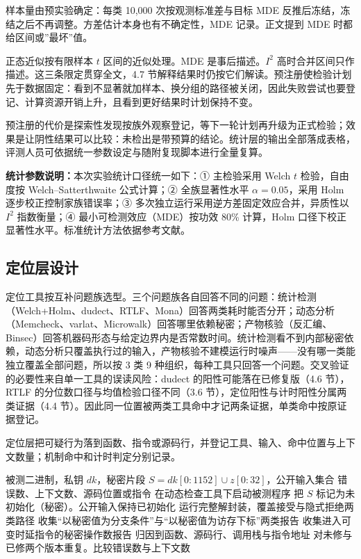 样本量由预实验确定：每类 10,000 次按观测标准差与目标 MDE 反推后冻结，冻结之后不再调整。方差估计本身也有不确定性，MDE 记录。正文提到 MDE 时都给区间或”最坏”值。

正态近似按有限样本 $t$ 区间的近似处理。MDE 是事后描述。$I^2$ 高时合并区间只作描述。这三条限定贯穿全文，4.7 节解释结果时仍按它们解读。预注册使检验计划先于数据固定：看到不显著就加样本、换分组的路径被关闭，因此失败尝试也要登记、计算资源开销上升，且看到更好结果时计划保持不变。

预注册的代价是探索性发现按族外观察登记，等下一轮计划再升级为正式检验；效果是让阴性结果可以比较：未检出是带预算的结论。统计层的输出全部落成表格，评测人员可依据统一参数设定与随附复现脚本进行全量复算。

\textbf{统计参数说明：}本次实验统计口径统一如下：① 主检验采用 Welch $t$ 检验，自由度按 Welch--Satterthwaite 公式计算；② 全族显著性水平 $\alpha=0.05$，采用 Holm 逐步校正控制家族错误率；③ 多次独立运行采用逆方差固定效应合并，异质性以 $I^2$ 指数衡量；④ 最小可检测效应（MDE）按功效 80\% 计算，Holm 口径下校正显著性水平。标准统计方法依据参考文献\cite{dudect,rtlf}。

\subsection{定位层设计}

定位工具按互补问题族选型。三个问题族各自回答不同的问题：统计检测（Welch+Holm、dudect、RTLF、Mona）回答两类耗时能否分开；动态分析（Memcheck、varlat、Microwalk）回答哪里依赖秘密；产物核验（反汇编、Binsec）回答机器码形态与给定边界内是否常数时间。统计检测看不到内部秘密依赖，动态分析只覆盖执行过的输入，产物核验不建模运行时噪声——没有哪一类能独立覆盖全部问题，所以按 3 类 9 种组织，每种工具只回答一个问题。交叉验证的必要性来自单一工具的误读风险：dudect 的阳性可能落在已修复版（4.6 节），RTLF 的分位数口径与均值检验口径不同（3.6 节），定位阳性与计时阳性分属两类证据（4.4 节）。因此同一位置被两类工具命中才记两条证据，单类命中按原证据登记。

定位层把可疑行为落到函数、指令或源码行，并登记工具、输入、命中位置与上下文数量；机制命中和计时判定分别记录。

\begin{algorithm}[H]
\caption{秘密标记动态检查}
\label{alg:memcheck}
\begin{algorithmic}[1]
\Require 被测二进制，私钥 $dk$，秘密片段 $S=dk[0{:}1152]\cup z[0{:}32]$，公开输入集合
\Ensure 错误数、上下文数、源码位置或指令
\State 在动态检查工具下启动被测程序
\State 把 $S$ 标记为未初始化（秘密）。公开输入保持已初始化
\State 运行完整解封装，覆盖接受与隐式拒绝两类路径
\State 收集“以秘密值为分支条件”与“以秘密值为访存下标”两类报告
\State 收集进入可变时延指令的秘密操作数报告
\State 归因到函数、源码行、调用栈与指令地址
\State 对未修与已修两个版本重复。比较错误数与上下文数
\end{algorithmic}
\end{algorithm}

